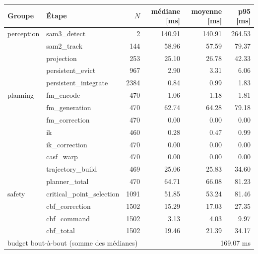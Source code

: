 \begin{tabular}{llrrrr}
\toprule
Groupe & \'Etape & $N$ & m\'ediane [ms] & moyenne [ms] & p95 [ms] \\
\midrule
perception & sam3\_detect & 2 & 140.91 & 140.91 & 264.53 \\
 & sam2\_track & 144 & 58.96 & 57.59 & 79.37 \\
 & projection & 253 & 25.10 & 26.78 & 42.33 \\
 & persistent\_evict & 967 & 2.90 & 3.31 & 6.06 \\
 & persistent\_integrate & 2384 & 0.84 & 0.99 & 1.83 \\
planning & fm\_encode & 470 & 1.06 & 1.18 & 1.81 \\
 & fm\_generation & 470 & 62.74 & 64.28 & 79.18 \\
 & fm\_correction & 470 & 0.00 & 0.00 & 0.00 \\
 & ik & 460 & 0.28 & 0.47 & 0.99 \\
 & ik\_correction & 470 & 0.00 & 0.00 & 0.00 \\
 & casf\_warp & 470 & 0.00 & 0.00 & 0.00 \\
 & trajectory\_build & 469 & 25.06 & 25.83 & 34.60 \\
 & planner\_total & 470 & 64.71 & 66.08 & 81.23 \\
safety & critical\_point\_selection & 1091 & 51.85 & 53.24 & 81.46 \\
 & cbf\_correction & 1502 & 15.29 & 17.03 & 27.35 \\
 & cbf\_command & 1502 & 3.13 & 4.03 & 9.97 \\
 & cbf\_total & 1502 & 19.46 & 21.39 & 34.17 \\
\midrule
\multicolumn{3}{l}{budget bout-à-bout (somme des médianes)} & \multicolumn{3}{r}{169.07 ms} \\
\bottomrule
\end{tabular}

